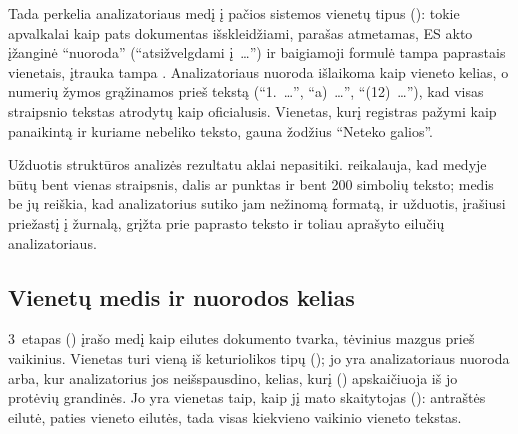 Tada  perkelia analizatoriaus medį į pačios sistemos vienetų tipus
(): tokie apvalkalai kaip pats dokumentas išskleidžiami, parašas atmetamas, ES akto įžanginė
\enquote{nuoroda} (\enquote{atsižvelgdami į~…}) ir baigiamoji formulė tampa paprastais
 vienetais, įtrauka tampa . Analizatoriaus nuoroda išlaikoma kaip
vieneto kelias, o numerių žymos grąžinamos prieš tekstą (\enquote{1.~…}, \enquote{a)~…},
\enquote{(12)~…}), kad visas straipsnio tekstas atrodytų kaip oficialusis. Vienetas, kurį
registras pažymi kaip panaikintą ir kuriame nebeliko teksto, gauna žodžius
\enquote{Neteko galios}.

Užduotis struktūros analizės rezultatu aklai nepasitiki.  reikalauja,
kad medyje būtų bent vienas straipsnis, dalis ar punktas ir bent 200 simbolių teksto; medis be
jų reiškia, kad analizatorius sutiko jam nežinomą formatą, ir užduotis, įrašiusi priežastį į
žurnalą, grįžta prie paprasto teksto ir toliau aprašyto eilučių analizatoriaus.

\subsection{Vienetų medis ir nuorodos kelias}\label{sec:corpus:tree}

3~etapas () įrašo medį kaip  eilutes dokumento tvarka,
tėvinius mazgus prieš vaikinius. Vienetas turi vieną iš keturiolikos tipų ();
jo  yra analizatoriaus nuoroda arba, kur analizatorius jos neišspausdino, kelias,
kurį  () apskaičiuoja iš jo protėvių grandinės.
Jo  yra vienetas taip, kaip jį mato skaitytojas ():
antraštės eilutė, paties vieneto eilutės, tada visas kiekvieno vaikinio vieneto tekstas.

